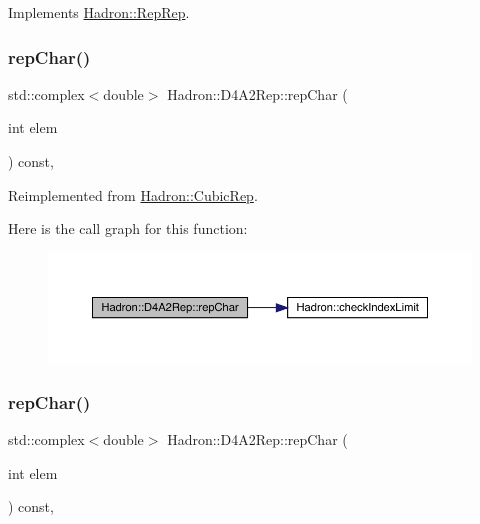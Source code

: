 Implements \mbox{\hyperlink{structHadron_1_1RepRep_ab3213025f6de249f7095892109575fde}{Hadron\+::\+Rep\+Rep}}.

\mbox{\label{structHadron_1_1D4A2Rep_ac408f55785ba08ce215277bb1cb4a006}} 
\subsubsection{\texorpdfstring{repChar()}{repChar()}\hspace{0.1cm}{\footnotesize\ttfamily [1/3]}}
{\footnotesize\ttfamily std\+::complex$<$double$>$ Hadron\+::\+D4\+A2\+Rep\+::rep\+Char (\begin{DoxyParamCaption}\item[{int}]{elem }\end{DoxyParamCaption}) const\hspace{0.3cm}{\ttfamily [inline]}, {\ttfamily [virtual]}}



Reimplemented from \mbox{\hyperlink{structHadron_1_1CubicRep_af45227106e8e715e84b0af69cd3b36f8}{Hadron\+::\+Cubic\+Rep}}.

Here is the call graph for this function\+:
\nopagebreak
\begin{figure}[H]
\begin{center}
\leavevmode
\includegraphics[width=350pt]{d7/d66/structHadron_1_1D4A2Rep_ac408f55785ba08ce215277bb1cb4a006_cgraph}
\end{center}
\end{figure}
\mbox{\label{structHadron_1_1D4A2Rep_ac408f55785ba08ce215277bb1cb4a006}} 
\subsubsection{\texorpdfstring{repChar()}{repChar()}\hspace{0.1cm}{\footnotesize\ttfamily [2/3]}}
{\footnotesize\ttfamily std\+::complex$<$double$>$ Hadron\+::\+D4\+A2\+Rep\+::rep\+Char (\begin{DoxyParamCaption}\item[{int}]{elem }\end{DoxyParamCaption}) const\hspace{0.3cm}{\ttfamily [inline]}, {\ttfamily [virtual]}}



